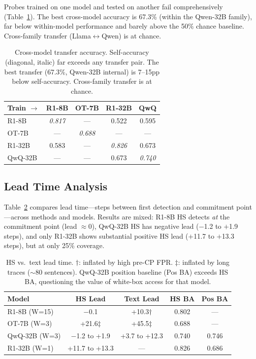 \documentclass[11pt]{article}
\begin{document}
Probes trained on one model and tested on another fail comprehensively (Table~\ref{tab:transfer}). The best cross-model accuracy is 67.3\% (within the Qwen-32B family), far below within-model performance and barely above the 50\% chance baseline. Cross-family transfer (Llama$\leftrightarrow$Qwen) is at chance.

\begin{table}[t]
\centering
\small
\begin{tabular}{lcccc}
\toprule
\textbf{Train $\to$} & \textbf{R1-8B} & \textbf{OT-7B} & \textbf{R1-32B} & \textbf{QwQ} \\
\midrule
R1-8B & \textit{0.817} & --- & 0.522 & 0.595 \\
OT-7B & --- & \textit{0.688} & --- & --- \\
R1-32B & 0.583 & --- & \textit{0.826} & 0.673 \\
QwQ-32B & --- & --- & 0.673 & \textit{0.740} \\
\bottomrule
\end{tabular}
\caption{Cross-model transfer accuracy. Self-accuracy (diagonal, italic) far exceeds any transfer pair. The best transfer (67.3\%, Qwen-32B internal) is 7--15pp below self-accuracy. Cross-family transfer is at chance.}
\label{tab:transfer}
\end{table}

\subsection{Lead Time Analysis}

Table~\ref{tab:lead} compares lead time---steps between first detection and commitment point---across methods and models. Results are mixed: R1-8B HS detects \emph{at} the commitment point (lead $\approx$0), QwQ-32B HS has negative lead ($-$1.2 to $+$1.9 steps), and only R1-32B shows substantial positive HS lead ($+$11.7 to $+$13.3 steps), but at only 25\% coverage.

\begin{table}[t]
\centering
\small
\begin{tabular}{lcccc}
\toprule
\textbf{Model} & \textbf{HS Lead} & \textbf{Text Lead} & \textbf{HS BA} & \textbf{Pos BA} \\
\midrule
R1-8B (W=15) & $-$0.1 & +10.3$\dagger$ & 0.802 & --- \\
OT-7B (W=3) & +21.6$\ddagger$ & +45.5$\ddagger$ & 0.688 & --- \\
QwQ-32B (W=3) & $-$1.2 to +1.9 & +3.7 to +12.3 & 0.740 & 0.746 \\
R1-32B (W=1) & +11.7 to +13.3 & --- & 0.826 & 0.686 \\
\bottomrule
\end{tabular}
\caption{HS vs.\ text lead time. $\dagger$: inflated by high pre-CP FPR. $\ddagger$: inflated by long traces ($\sim$80 sentences). QwQ-32B position baseline (Pos BA) exceeds HS BA, questioning the value of white-box access for that model.}
\label{tab:lead}
\end{table}
\end{document}
